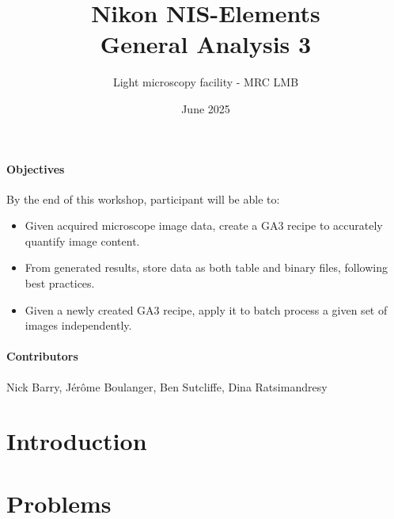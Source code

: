 \documentclass[a4paper,dvipsnames,headsepline,8pt,twocolumn]{scrartcl}
\title{Nikon NIS-Elements\\ General Analysis 3}
\author{Light microscopy facility - MRC LMB}
\date{June 2025}
\begin{document}
\maketitle

\paragraph{Objectives}
By the end of this workshop, participant will be able to:
\begin{itemize}
\item Given acquired microscope image data, create a GA3 recipe to accurately quantify image content.
\item From generated results, store data as both table and binary files, following best practices.
\item Given a newly created GA3 recipe, apply it to batch process a given set of images independently.
\end{itemize}

\paragraph{Contributors}
Nick Barry, Jérôme Boulanger, Ben Sutcliffe, Dina Ratsimandresy

\tableofcontents %
\section{Introduction}

\section{Problems}

\printbibliography

\appendix
\addtolength{\leftskip}{0.5cm}
\printendnotes
\end{document}
